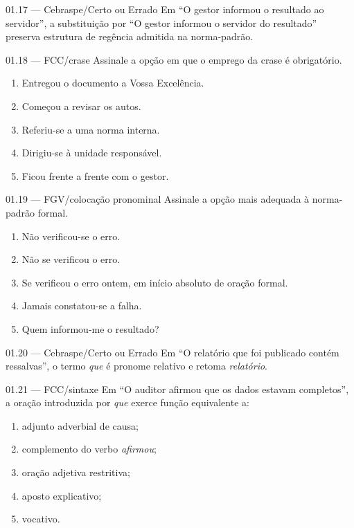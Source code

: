 \begin{questao}{ 01.17 — Cebraspe/Certo ou Errado}
Em ``O gestor informou o resultado ao servidor'', a substituição por ``O gestor informou o servidor do resultado'' preserva estrutura de regência admitida na norma-padrão.
\end{questao}

\begin{questao}{ 01.18 — FCC/crase}
Assinale a opção em que o emprego da crase é obrigatório.
\begin{enumerate}[label=\Alph*)]
\item Entregou o documento a Vossa Excelência.
\item Começou a revisar os autos.
\item Referiu-se a uma norma interna.
\item Dirigiu-se à unidade responsável.
\item Ficou frente a frente com o gestor.
\end{enumerate}
\end{questao}

\begin{questao}{ 01.19 — FGV/colocação pronominal}
Assinale a opção mais adequada à norma-padrão formal.
\begin{enumerate}[label=\Alph*)]
\item Não verificou-se o erro.
\item Não se verificou o erro.
\item Se verificou o erro ontem, em início absoluto de oração formal.
\item Jamais constatou-se a falha.
\item Quem informou-me o resultado?
\end{enumerate}
\end{questao}

\begin{questao}{ 01.20 — Cebraspe/Certo ou Errado}
Em ``O relatório que foi publicado contém ressalvas'', o termo \emph{que} é pronome relativo e retoma \emph{relatório}.
\end{questao}

\begin{questao}{ 01.21 — FCC/sintaxe}
Em ``O auditor afirmou que os dados estavam completos'', a oração introduzida por \emph{que} exerce função equivalente a:
\begin{enumerate}[label=\Alph*)]
\item adjunto adverbial de causa;
\item complemento do verbo \emph{afirmou};
\item oração adjetiva restritiva;
\item aposto explicativo;
\item vocativo.
\end{enumerate}
\end{questao}

